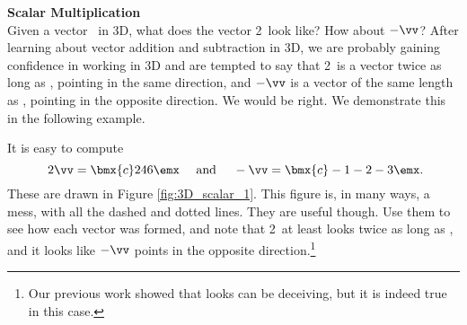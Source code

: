 \medskip

\noindent \large \textsf{\textbf{Scalar Multiplication}} \normalsize\\

Given a vector \vv\ in 3D, what does the vector 2\vv\ look like? How about $-\vv$? After learning about vector addition and subtraction in 3D, we are probably gaining confidence in working in 3D and are tempted to say that 2\vv\ is a vector twice as long as \vv, pointing in the same direction, and $-\vv$ is a vector of the same length as \vv, pointing in the opposite direction. We would be right. We demonstrate this in the following example.\\

{\begin{myfigure}
\begin{center}
\end{center}
\label{fig:3D_scalar_1}
\end{myfigure}

It is easy to compute 
\[\
2\vv = \bmx{c}2\\4\\6\emx \quad \text{ and } \quad -\vv = \bmx{c} -1\\-2\\-3\emx.
\]
These are drawn in Figure \ref{fig:3D_scalar_1}. This figure is, in many ways, a mess, with all the dashed and dotted lines. They are useful though. Use them to see how each vector was formed, and note that 2\vv\ at least looks twice as long as \vv, and it looks like $-\vv$ points in the opposite direction.\footnote{Our previous work showed that looks can be deceiving, but it is indeed true in this case.} }

